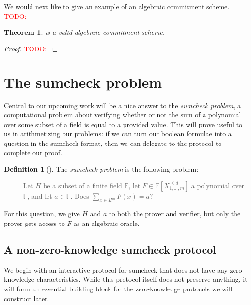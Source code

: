 \documentclass[english,12pt]{reedthesis}
\theoremstyle{plain}
\newtheorem{thm}{Theorem}[section]
\theoremstyle{definition}
\newtheorem{defn}[defn]{Definition}
\theoremstyle{remark}
\newcommand{\TODO}[1]{\textcolor{red}{TODO: #1}}
\begin{document}
We would next like to give an example of an algebraic commitment scheme. \TODO{}

\begin{thm}\label{thm:alg-commit-scheme}
   is a valid algebraic commitment scheme.
\end{thm}

\begin{proof}
  \TODO{}
\end{proof}

\section{The sumcheck problem}

Central to our upcoming work will be a nice answer to the \emph{sumcheck
  problem}, a computational problem about verifying whether or not the sum of a
polynomial over some subset of a field is equal to a provided value. This will
prove useful to us in arithmetizing our problems: if we can turn our boolean
formulae into a question in the sumcheck format, then we can delegate to the
protocol to complete our proof.

\begin{defn}[{\cite{LFKN92}}]\label{def:sumcheck}
  The \emph{sumcheck problem} is the following problem:
  \begin{quote}
    Let $H$ be a subset of a finite field $\mathbb{F}$, let
    $F \in \mathbb{F}[X_{1, \ldots, m}^{\le d}]$ a polynomial over $\mathbb{F}$, and let
    $a \in \mathbb{F}$. Does $\sum_{x \in H^{m}}F(x) = a$?
  \end{quote}
  For this question, we give $H$ and $a$ to both the prover and verifier, but
  only the prover gets access to $F$ as an algebraic oracle.
\end{defn}

\subsection{A non-zero-knowledge sumcheck protocol}

We begin with an interactive protocol for sumcheck that does not have any
zero-knowledge characteristics. While this protocol itself does not preserve
anything, it will form an essential building block for the zero-knowledge
protocols we will construct later.
\end{document}
